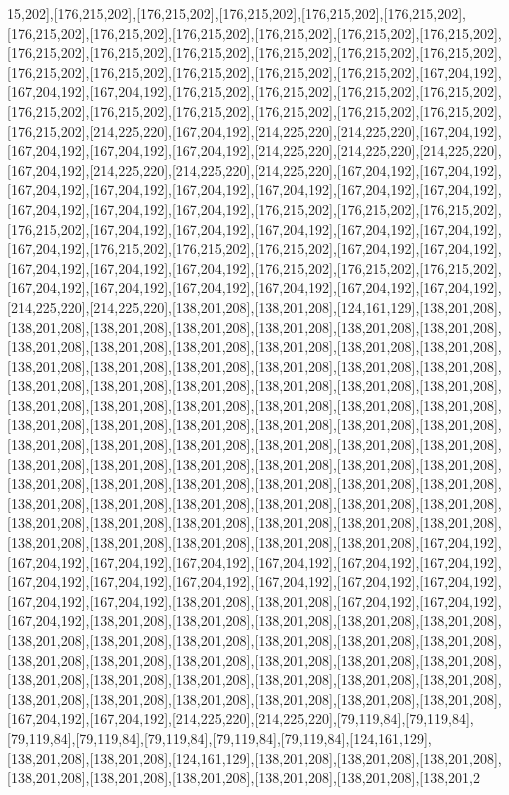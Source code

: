 15,202],[176,215,202],[176,215,202],[176,215,202],[176,215,202],[176,215,202],[176,215,202],[176,215,202],[176,215,202],[176,215,202],[176,215,202],[176,215,202],[176,215,202],[176,215,202],[176,215,202],[176,215,202],[176,215,202],[176,215,202],[176,215,202],[176,215,202],[176,215,202],[176,215,202],[176,215,202],[167,204,192],[167,204,192],[167,204,192],[176,215,202],[176,215,202],[176,215,202],[176,215,202],[176,215,202],[176,215,202],[176,215,202],[176,215,202],[176,215,202],[176,215,202],[176,215,202],[214,225,220],[167,204,192],[214,225,220],[214,225,220],[167,204,192],[167,204,192],[167,204,192],[167,204,192],[214,225,220],[214,225,220],[214,225,220],[167,204,192],[214,225,220],[214,225,220],[214,225,220],[167,204,192],[167,204,192],[167,204,192],[167,204,192],[167,204,192],[167,204,192],[167,204,192],[167,204,192],[167,204,192],[167,204,192],[167,204,192],[176,215,202],[176,215,202],[176,215,202],[176,215,202],[167,204,192],[167,204,192],[167,204,192],[167,204,192],[167,204,192],[167,204,192],[176,215,202],[176,215,202],[176,215,202],[167,204,192],[167,204,192],[167,204,192],[167,204,192],[167,204,192],[176,215,202],[176,215,202],[176,215,202],[167,204,192],[167,204,192],[167,204,192],[167,204,192],[167,204,192],[167,204,192],[214,225,220],[214,225,220],[138,201,208],[138,201,208],[124,161,129],[138,201,208],[138,201,208],[138,201,208],[138,201,208],[138,201,208],[138,201,208],[138,201,208],[138,201,208],[138,201,208],[138,201,208],[138,201,208],[138,201,208],[138,201,208],[138,201,208],[138,201,208],[138,201,208],[138,201,208],[138,201,208],[138,201,208],[138,201,208],[138,201,208],[138,201,208],[138,201,208],[138,201,208],[138,201,208],[138,201,208],[138,201,208],[138,201,208],[138,201,208],[138,201,208],[138,201,208],[138,201,208],[138,201,208],[138,201,208],[138,201,208],[138,201,208],[138,201,208],[138,201,208],[138,201,208],[138,201,208],[138,201,208],[138,201,208],[138,201,208],[138,201,208],[138,201,208],[138,201,208],[138,201,208],[138,201,208],[138,201,208],[138,201,208],[138,201,208],[138,201,208],[138,201,208],[138,201,208],[138,201,208],[138,201,208],[138,201,208],[138,201,208],[138,201,208],[138,201,208],[138,201,208],[138,201,208],[138,201,208],[138,201,208],[138,201,208],[138,201,208],[138,201,208],[138,201,208],[138,201,208],[138,201,208],[138,201,208],[138,201,208],[167,204,192],[167,204,192],[167,204,192],[167,204,192],[167,204,192],[167,204,192],[167,204,192],[167,204,192],[167,204,192],[167,204,192],[167,204,192],[167,204,192],[167,204,192],[167,204,192],[167,204,192],[138,201,208],[138,201,208],[167,204,192],[167,204,192],[167,204,192],[138,201,208],[138,201,208],[138,201,208],[138,201,208],[138,201,208],[138,201,208],[138,201,208],[138,201,208],[138,201,208],[138,201,208],[138,201,208],[138,201,208],[138,201,208],[138,201,208],[138,201,208],[138,201,208],[138,201,208],[138,201,208],[138,201,208],[138,201,208],[138,201,208],[138,201,208],[138,201,208],[138,201,208],[138,201,208],[138,201,208],[138,201,208],[138,201,208],[138,201,208],[167,204,192],[167,204,192],[214,225,220],[214,225,220],[79,119,84],[79,119,84],[79,119,84],[79,119,84],[79,119,84],[79,119,84],[79,119,84],[124,161,129],[138,201,208],[138,201,208],[124,161,129],[138,201,208],[138,201,208],[138,201,208],[138,201,208],[138,201,208],[138,201,208],[138,201,208],[138,201,208],[138,201,2